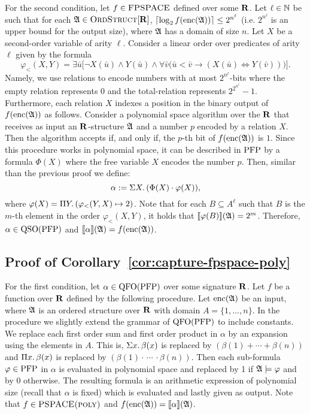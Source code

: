 For the second condition, let $f\in \text{\sc FPSPACE}$ defined over some $\mathbf{R}$. Let $\ell\in\mathbb{N}$ be such that for each $\mathfrak{A}\in\text{\sc OrdStruct}[\mathbf{R}]$, $\lceil\log_2 f({\rm enc}(\mathfrak{A})) \rceil \leq 2^{n^\ell}$ (i.e. $2^{n^\ell}$ is an upper bound for the output size), where $\mathfrak{A}$ has a domain of size $n$. Let $X$ be a second-order variable of arity $\ell$. Consider a linear order over predicates of arity $\ell$ given by the formula 
$$
\varphi_{<}(X,Y) = \exists\bar{u}\big[\neg X(\bar{u})\wedge Y(\bar{u})\wedge \forall\bar{v}\big(
\bar{u}<\bar{v}\to(X(\bar{u})\iff Y(\bar{v}))\big)\big].
$$
Namely, we use relations to encode numbers with at most $2^{n^\ell}$-bits where the empty relation represents $0$ and the total-relation represents $2^{2^{n^\ell}}-1$.
Furthermore, each relation $X$ indexes a position in the binary output of $f({\rm enc}(\mathfrak{A}))$ as follows.
Consider a polynomial space algorithm over the $\mathbf{R}$ that receives as input an $\mathbf{R}$-structure $\mathfrak{A}$ and a number $p$ encoded by a relation $X$. Then the algorithm accepts if, and only if, the $p$-th bit of $f({\rm enc}(\mathfrak{A}))$ is $1$. 
Since this procedure works in polynomial space, it can be described in ${\rm PFP}$ \cite{AbiteboulV89} by a formula $\Phi(X)$ where the free variable $X$ encodes the number $p$. Then, similar than the previous proof we define:
$$
\alpha := \Sigma{X}.\,(\Phi(X)\cdot\varphi(X)),
$$ 
where $\varphi(X) = \Pi{Y}.\,(\varphi_{<}(Y,X)\mapsto 2)$. Note that for each $B\subseteq A^{\ell}$ such that $B$ is the $m$-th element in the order $\varphi_{<}(X,Y)$, it holds that ${\llbracket{}{\varphi(B)}\rrbracket}(\mathfrak{A}) = 2^m$. Therefore, $\alpha\in{\rm QSO}({\rm PFP})$ and ${\llbracket{}{\alpha}\rrbracket}(\mathfrak{A}) = f({\rm enc}(\mathfrak{A}))$.

\medskip


\subsection*{Proof of Corollary~\ref{cor:capture-fpspace-poly}}

For the first condition, let $\alpha\in{\rm QFO}({\rm PFP})$ over some signature $\mathbf{R}$. Let $f$ be a function over $\mathbf{R}$ defined by the following procedure. Let ${\rm enc}(\mathfrak{A})$ be an input, where $\mathfrak{A}$ is an ordered structure over $\mathbf{R}$ with domain $A = \{1,\ldots,n\}$. In the procedure we slightly extend the grammar of ${\rm QFO}({\rm PFP})$ to include constants. We replace each first order sum and first order product in $\alpha$ by an expansion using the elements in $A$. This is, $\Sigma{x}.\, \beta(x)$ is replaced by $(\beta(1)+\cdots+\beta(n))$ and $\Pi{x}.\,\beta(x)$ is replaced by $(\beta(1)\cdot\,\cdots\,\cdot\beta(n))$. Then each sub-formula $\varphi\in{\rm PFP}$ in $\alpha$ is evaluated in polynomial space and replaced by 1 if $\mathfrak{A}\models\varphi$ and by 0 otherwise. The resulting formula is an arithmetic expression of polynomial size  (recall that $\alpha$ is fixed) which is evaluated and lastly given as output. Note that $f\in\text{\sc PSPACE(poly)}$ and $f({\rm enc}(\mathfrak{A})) = {\llbracket{}{\alpha}\rrbracket}(\mathfrak{A})$.

